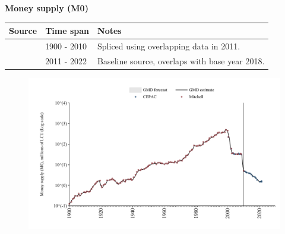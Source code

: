 \documentclass[12pt,a4paper,landscape]{article}
\begin{document}
\begin{adjustbox}{max totalsize={\paperwidth}{\paperheight},center}
\begin{minipage}[t][\textheight][t]{\textwidth}
\vspace*{0.5cm}
{}
\begin{center}
{\Large\bfseries Money supply (M0)}
\end{center}
\vspace{0.5cm}
\begin{table}[H]
\centering
\small
\begin{tabular}{|l|l|l|}
\hline
\textbf{Source} & \textbf{Time span} & \textbf{Notes} \\
\hline
\rowcolor{white}\cite{Mitchell}& 1900 - 2010 &Spliced using overlapping data in 2011. \\
\rowcolor{lightgray}\cite{CEPAC}& 2011 - 2022 &Baseline source, overlaps with base year 2018. \\
\hline
\end{tabular}
\end{table}
\begin{figure}[H]
\centering
\includegraphics[width=\textwidth,height=0.6\textheight,keepaspectratio]{graphs/SLV_M0.pdf}
\end{figure}
\end{minipage}
\end{adjustbox}
\end{document}
